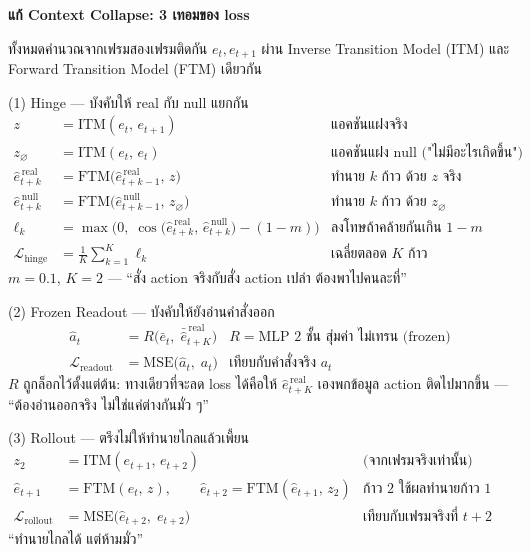 \documentclass[12pt,a4paper]{article}
\begin{document}
{\Large\bfseries แก้ Context Collapse: 3 เทอมของ loss}

\vspace{2mm}
\noindent ทั้งหมดคำนวณจากเฟรมสองเฟรมติดกัน $e_t, e_{t+1}$ ผ่าน Inverse Transition Model (ITM) และ
Forward Transition Model (FTM) เดียวกัน

\vspace{4mm}
\begin{eqbox}{(1) Hinge --- บังคับให้ real กับ null แยกกัน}
\begin{align*}
z &= \mathrm{ITM}(e_t,\, e_{t+1}) &\text{แอคชันแฝงจริง}\\
z_{\varnothing} &= \mathrm{ITM}(e_t,\, e_t) &\text{แอคชันแฝง null (}\text{"ไม่มีอะไรเกิดขึ้น"}\text{)}\\[2mm]
\hat e^{\,\mathrm{real}}_{t+k} &= \mathrm{FTM}\big(\hat e^{\,\mathrm{real}}_{t+k-1},\, z\big) &\text{ทำนาย }k\text{ ก้าว ด้วย }z\text{ จริง}\\
\hat e^{\,\mathrm{null}}_{t+k} &= \mathrm{FTM}\big(\hat e^{\,\mathrm{null}}_{t+k-1},\, z_{\varnothing}\big) &\text{ทำนาย }k\text{ ก้าว ด้วย }z_\varnothing\\[2mm]
\ell_k &= \max\!\Big(0,\; \cos\big(\hat e^{\,\mathrm{real}}_{t+k},\, \hat e^{\,\mathrm{null}}_{t+k}\big) - (1-m)\Big) &\text{ลงโทษถ้าคล้ายกันเกิน }1-m\\
\mathcal{L}_{\text{hinge}} &= \frac{1}{K}\sum_{k=1}^{K} \ell_k &\text{เฉลี่ยตลอด }K\text{ ก้าว}
\end{align*}
$m=0.1$, $K=2$ --- ``สั่ง action จริงกับสั่ง action เปล่า ต้องพาไปคนละที่''
\end{eqbox}

\vspace{4mm}
\begin{eqbox}{(2) Frozen Readout --- บังคับให้ยังอ่านคำสั่งออก}
\begin{align*}
\hat a_t &= R\big(\bar e_t,\; \bar{\hat e}^{\,\mathrm{real}}_{t+K}\big) &R = \text{MLP 2 ชั้น สุ่มค่า ไม่เทรน (frozen)}\\
\mathcal{L}_{\text{readout}} &= \mathrm{MSE}\big(\hat a_t,\; a_t\big) &\text{เทียบกับคำสั่งจริง }a_t
\end{align*}
$R$ ถูกล็อกไว้ตั้งแต่ต้น: ทางเดียวที่จะลด loss ได้คือให้ $\hat e^{\,\mathrm{real}}_{t+K}$ เองพกข้อมูล
action ติดไปมากขึ้น --- ``ต้องอ่านออกจริง ไม่ใช่แค่ต่างกันมั่ว ๆ''
\end{eqbox}

\vspace{4mm}
\begin{eqbox}{(3) Rollout --- ตรึงไม่ให้ทำนายไกลแล้วเพี้ยน}
\begin{align*}
z_2 &= \mathrm{ITM}(e_{t+1},\, e_{t+2}) &\text{(จากเฟรมจริงเท่านั้น)}\\
\hat e_{t+1} &= \mathrm{FTM}(e_t,\, z), \qquad
\hat e_{t+2} = \mathrm{FTM}(\hat e_{t+1},\, z_2) &\text{ก้าว 2 ใช้ผลทำนายก้าว 1 เป็น input}\\
\mathcal{L}_{\text{rollout}} &= \mathrm{MSE}\big(\hat e_{t+2},\; e_{t+2}\big) &\text{เทียบกับเฟรมจริงที่ }t+2
\end{align*}
``ทำนายไกลได้ แต่ห้ามมั่ว''
\end{eqbox}
\end{document}
